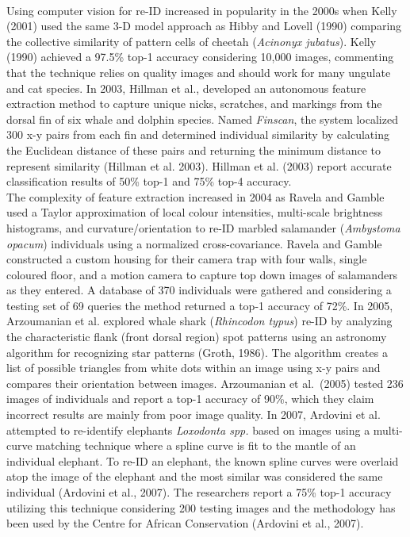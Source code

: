 \documentclass[11pt]{article}
\begin{document}
\newline
\\
Using computer vision for re-ID increased in popularity in the 2000s when Kelly (2001) used the same 3-D model approach as Hibby and Lovell (1990) comparing the collective similarity of pattern cells of cheetah (\textit{Acinonyx jubatus}). Kelly (1990) achieved a 97.5\% top-1 accuracy considering 10,000 images, commenting that the technique relies on quality images and should work for many ungulate and cat species. In 2003, Hillman et al., developed an autonomous feature extraction method to capture unique nicks, scratches, and markings from the dorsal fin of six whale and dolphin species. Named \textit{Finscan}, the system localized 300 x-y pairs from each fin and determined individual similarity by calculating the Euclidean distance of these pairs and returning the minimum distance to represent similarity (Hillman et al. 2003). Hillman et al. (2003) report accurate classification results of 50\% top-1 and 75\% top-4 accuracy.
\newline
\\
The complexity of feature extraction increased in 2004 as Ravela and Gamble used a Taylor approximation of local colour intensities, multi-scale brightness histograms, and curvature/orientation to re-ID marbled salamander (\textit{Ambystoma opacum}) individuals using a normalized cross-covariance. Ravela and Gamble constructed a custom housing for their camera trap with four walls, single coloured floor, and a motion camera to capture top down images of salamanders as they entered. A database of 370 individuals were gathered and considering a testing set of 69 queries the method returned a top-1 accuracy of 72\%. In 2005, Arzoumanian et al. explored whale shark (\textit{Rhincodon typus}) re-ID by analyzing the characteristic flank (front dorsal region) spot patterns using an astronomy algorithm for recognizing star patterns (Groth, 1986). The algorithm creates a list of possible triangles from white dots within an image using x-y pairs and compares their orientation between images. Arzoumanian et al.~(2005) tested 236 images of individuals and report a top-1 accuracy of 90\%, which they claim incorrect results are mainly from poor image quality. In 2007, Ardovini et al. attempted to re-identify elephants \textit{Loxodonta spp.} based on images using a multi-curve matching technique where a spline curve is fit to the mantle of an individual elephant. To re-ID an elephant, the known spline curves were overlaid atop the image of the elephant and the most similar was considered the same individual (Ardovini et al., 2007). The researchers report a 75\% top-1 accuracy utilizing this technique considering 200 testing images and the methodology has been used by the Centre for African Conservation (Ardovini et al., 2007).
\end{document}
